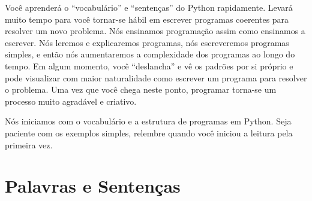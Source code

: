 Você aprenderá o ``vocabulário'' e ``sentenças'' do Python rapidamente.
Levará muito tempo para você tornar-se hábil em escrever programas coerentes
para resolver um novo problema. Nós ensinamos programação assim como ensinamos
a escrever. Nós leremos e explicaremos programas, nós escreveremos programas
simples, e então nós aumentaremos a complexidade dos programas ao longo do tempo.
Em algum momento, você ``deslancha'' e vê os padrões por si próprio e pode visualizar
com maior naturalidade como escrever um programa para resolver o problema. Uma
vez que você chega neste ponto, programar torna-se um processo muito agradável e
criativo.
%

Nós iniciamos com o vocabulário e a estrutura de programas em Python. Seja paciente
com os exemplos simples, relembre quando você iniciou a leitura pela primeira vez.
%

\section{Palavras e Sentenças}
%

